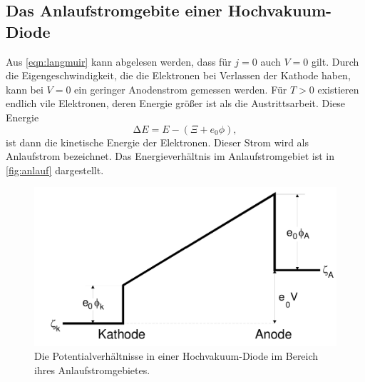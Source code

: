 \subsection{Das Anlaufstromgebite einer Hochvakuum-Diode}
\label{sec:Das Anlaufstromgebite einer Hochvakuum-Diode}

Aus \autoref{eqn:langmuir} kann abgelesen werden, dass für $j = 0$ auch $V = 0$ gilt.
Durch die Eigengeschwindigkeit, die die Elektronen bei Verlassen der Kathode haben, kann bei $V = 0$
ein geringer Anodenstrom gemessen werden. Für $T > 0$ existieren endlich vile Elektronen, deren Energie größer ist 
als die Austrittsarbeit. Diese Energie 
\begin{equation}
    \increment E = E - \left(\Xi + e_0\phi\right),
\end{equation}    
ist dann die kinetische Energie der Elektronen. Dieser Strom wird als Anlaufstrom bezeichnet.
Das Energieverhältnis im Anlaufstromgebiet ist in \autoref{fig:anlauf} dargestellt.

\begin{figure}[H]
    \centering
    \includegraphics[width=0.5\linewidth]{data/anlauf.png}
    \caption{Die Potentialverhältnisse in einer Hochvakuum-Diode im Bereich ihres Anlaufstromgebietes.\cite{elektron}}
    \label{fig:anlauf}
\end{figure}

\subsection{}